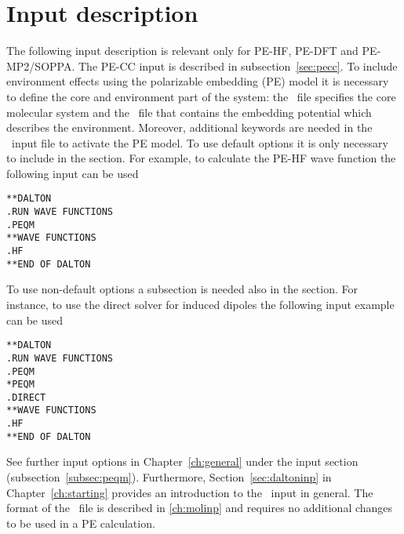 \section{Input description}
The following input description is relevant only for PE-HF, PE-DFT and PE-MP2/SOPPA. The PE-CC input is described in subsection~\ref{sec:pecc}. To include environment effects using the polarizable embedding (PE) model it is necessary to define the core and environment part of the system: the \molinp\ file specifies the core molecular system and the \potinp\ file that contains the embedding potential which describes the environment. Moreover, additional keywords are needed in the \dalinp\ input file to activate the PE model. To use default options it is only necessary to include  in the  section. For example, to calculate the PE-HF wave function the following input can be used
\begin{verbatim}
**DALTON
.RUN WAVE FUNCTIONS
.PEQM
**WAVE FUNCTIONS
.HF
**END OF DALTON
\end{verbatim}
To use non-default options a  subsection is needed also in the  section. For instance, to use the direct solver for induced dipoles the following input example can be used
\begin{verbatim}
**DALTON
.RUN WAVE FUNCTIONS
.PEQM
*PEQM
.DIRECT
**WAVE FUNCTIONS
.HF
**END OF DALTON
\end{verbatim}
See further input options in Chapter~\ref{ch:general} under the  input section (subsection~\ref{subsec:peqm}). Furthermore, Section~\ref{sec:daltoninp} in Chapter~\ref{ch:starting} provides an introduction to the \dalton\ input in general. The format of the \molinp\ file is described in \ref{ch:molinp} and requires no additional changes to be used in a PE calculation.

